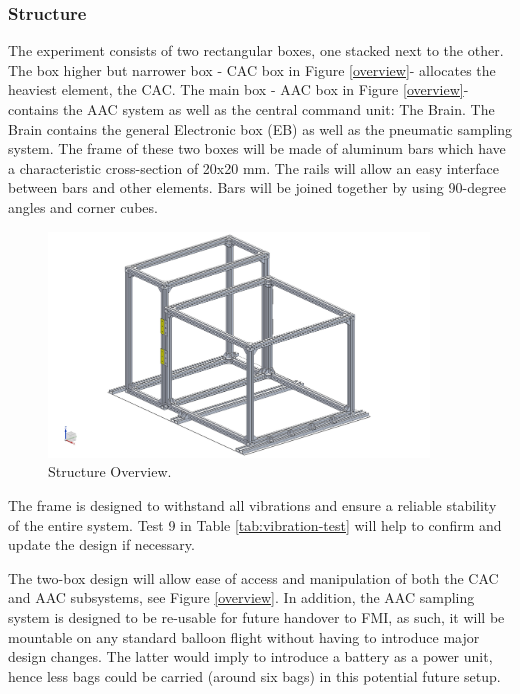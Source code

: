 \subsubsection{Structure}

The experiment consists of two rectangular boxes, one stacked next to the other. The box higher but narrower box - CAC box in Figure \ref{overview}- allocates the heaviest element, the CAC. The main box - AAC box in Figure \ref{overview}- contains the AAC system as well as the central command unit: The Brain. The Brain contains the general Electronic box (EB) as well as the pneumatic sampling system. The frame of these two boxes will be made of aluminum bars which have a characteristic cross-section of 20x20 mm. The rails will allow an easy interface between bars and other elements. Bars will be joined together by using 90-degree angles and corner cubes.




 \begin{figure}[H]
     \centering
     \includegraphics[width=0.9\textwidth]{4-experiment-design/img/Mechanical/structure_pic.jpg}
     \caption{Structure Overview.}
     \label{structure}
\end{figure}

The frame is designed to withstand all vibrations and ensure a reliable stability of the entire system. Test 9 in Table \ref{tab:vibration-test} will help to confirm and update the design if necessary. 

The two-box design will allow ease of access and manipulation of both the CAC and AAC subsystems, see Figure \ref{overview}. In addition, the AAC sampling system is designed to be re-usable for future handover to FMI, as such, it will be mountable on any standard balloon flight without having to introduce major design changes. The latter would imply to introduce a battery as a power unit, hence less bags could be carried (around six bags) in this potential future setup.

